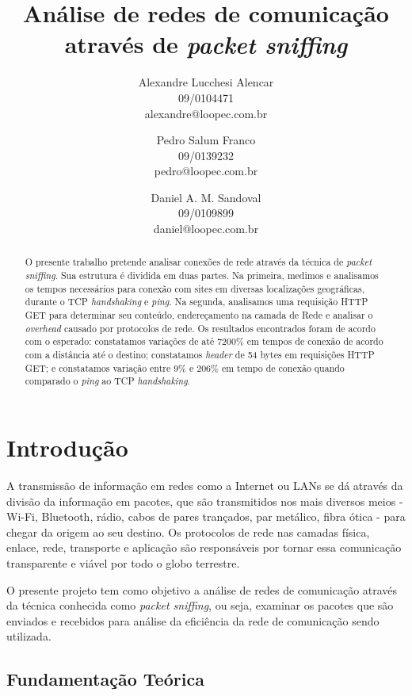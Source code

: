 \documentclass[12pt,a4paper]{report}
\title{Análise de redes de comunicação através de \textit{packet sniffing}}
\author{Alexandre Lucchesi Alencar\\
	09/0104471\\
	alexandre@loopec.com.br
	\and
	Pedro Salum Franco\\
	09/0139232\\
	pedro@loopec.com.br
	\and
	Daniel A. M. Sandoval\\
	09/0109899\\
	daniel@loopec.com.br}
\begin{document}
\maketitle

\begin{abstract}
O presente trabalho pretende analisar conexões de rede através da técnica de \textit{packet sniffing}. Sua estrutura é dividida em duas partes. Na primeira, medimos e analisamos os tempos necessários para conexão com sites em diversas localizações geográficas, durante o TCP \textit{handshaking} e \textit{ping}. Na segunda, analisamos uma requisição HTTP GET para determinar seu conteúdo, endereçamento na camada de Rede e analisar o \textit{overhead} causado por protocolos de rede. Os resultados encontrados foram de acordo com o esperado: constatamos variações de até 7200\% em tempos de conexão de acordo com a distância até o destino; constatamos \textit{header} de 54 bytes em requisições HTTP GET; e constatamos variação entre 9\% e 206\% em tempo de conexão quando comparado o \textit{ping} ao TCP \textit{handshaking}.
\end{abstract}

\tableofcontents

\chapter{Introdução}
A transmissão de informação em redes como a Internet ou LANs se dá através da divisão da informação em pacotes, que são transmitidos nos mais diversos meios - Wi-Fi, Bluetooth, rádio, cabos de pares trançados, par metálico, fibra ótica - para chegar da origem ao seu destino.
Os protocolos de rede nas camadas física, enlace, rede, transporte e aplicação são responsáveis por tornar essa comunicação transparente e viável por todo o globo terrestre.

O presente projeto tem como objetivo a análise de redes de comunicação através da técnica conhecida como \textit{packet sniffing}, ou seja, examinar os pacotes que são enviados e recebidos para análise da eficiência da rede de comunicação sendo utilizada.

\section{Fundamentação Teórica}
\end{document}
